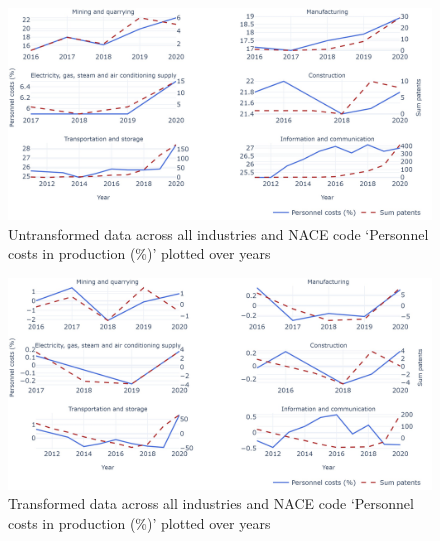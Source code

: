 \documentclass[
  12pt,
  a4paperpaper,
]{article}
\begin{document}
\begin{figure}[H]

{\centering \includegraphics{rieg2023_files/figure-pdf/fig-untransformed-data-personnel-costs-output-1.jpeg}

}

\caption{\label{fig-untransformed-data-personnel-costs}Untransformed
data across all industries and NACE code `Personnel costs in production
(\%)' plotted over years}

\end{figure}

\begin{figure}[H]

{\centering \includegraphics{rieg2023_files/figure-pdf/fig-transformed-data-personnel-costs-output-1.jpeg}

}

\caption{\label{fig-transformed-data-personnel-costs}Transformed data
across all industries and NACE code `Personnel costs in production (\%)'
plotted over years}

\end{figure}
\end{document}
